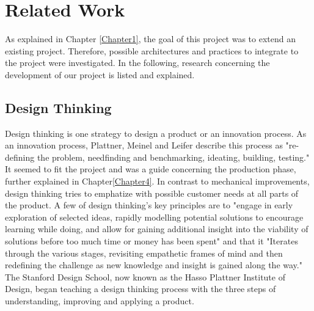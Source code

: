 
\chapter{Related Work} %

\label{Chapter2} %

As explained in Chapter \ref{Chapter1}, the goal of this project was to extend an existing project.
Therefore, possible architectures and practices to integrate to the project were investigated.
In the following, research concerning the development of our project is listed and explained.

\section{Design Thinking}
Design thinking is one strategy to design a product or an innovation process.
As an innovation process, Plattner, Meinel and Leifer describe this process as "re-defining the problem, needfinding and benchmarking, ideating, building, testing." \parencite{designThinkingBook}
It seemed to fit the project and was a guide concerning the production phase, further explained in Chapter\ref{Chapter4}.
In contrast to mechanical improvements, design thinking tries to emphatize with possible customer needs at all parts of the product.
A few of design thinking's key principles are to 
"engage in early exploration of selected ideas, rapidly modelling potential solutions to encourage learning 
while doing, and allow for gaining additional insight into the viability of 
solutions before too much time or money has been spent" and that it 
"Iterates through the various stages, revisiting empathetic frames of mind and then redefining the challenge as new knowledge and insight is gained along the way." 
\parencite{designThinking}
The Stanford Design School, now known as the Hasso Plattner Institute of Design, began teaching a design thinking process 
with the three steps of understanding, improving and applying a product. 


